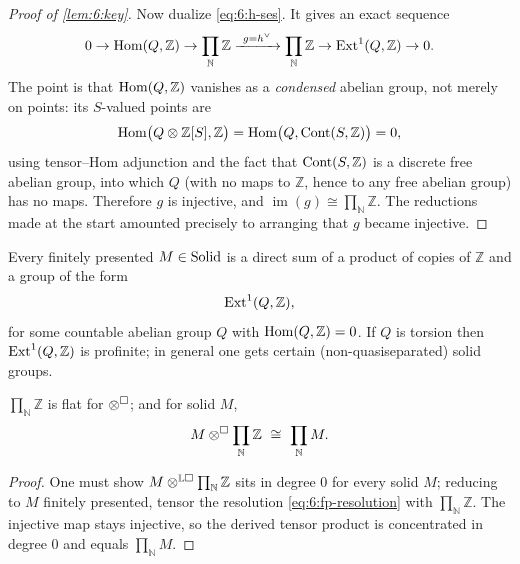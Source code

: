 \begin{proof}[Proof of \cref{lem:6:key}]
Now dualize \eqref{eq:6:h-ses}. It gives an exact sequence
\begin{equation*}
0\to\Homop(Q,\mathbb{Z})\to\prod_{\mathbb{N}}\mathbb{Z}\xrightarrow{\ g=h^{\vee}\ }
\prod_{\mathbb{N}}\mathbb{Z}\to\Ext^{1}(Q,\mathbb{Z})\to0 .
\end{equation*}
The point is that $\operatorname{Hom}(Q,\mathbb{Z})$ vanishes as a \emph{condensed} abelian
group, not merely on points: its $S$-valued points are
\begin{equation*}
\operatorname{Hom}\bigl(Q\otimes\mathbb{Z}[S],\mathbb{Z}\bigr)
=\operatorname{Hom}\bigl(Q,\operatorname{Cont}(S,\mathbb{Z})\bigr)=0,
\end{equation*}
using tensor--Hom adjunction and the fact that $\operatorname{Cont}(S,\mathbb{Z})$ is a discrete
free abelian group, into which $Q$ (with no maps to $\mathbb{Z}$, hence to any
free abelian group) has no maps. Therefore $g$ is injective, and
$\operatorname{im}(g)\cong\prod_{\mathbb{N}}\mathbb{Z}$. The reductions made at the
start amounted precisely to arranging that $g$ became injective.
\end{proof}

\begin{corollary}
\label{cor:6:fp-classification}
Every finitely presented $M\in\mathrm{Solid}$ is a direct sum of a product of copies of
$\mathbb{Z}$ and a group of the form
\begin{equation*}
\operatorname{Ext}^{1}(Q,\mathbb{Z}),
\end{equation*}
for some countable abelian group $Q$ with $\operatorname{Hom}(Q,\mathbb{Z})=0$. If $Q$ is
torsion then $\operatorname{Ext}^{1}(Q,\mathbb{Z})$ is profinite; in general one gets certain
(non-quasiseparated) solid groups.
\end{corollary}

\begin{corollary}
\label{cor:6:flat}
$\prod_{\mathbb{N}}\mathbb{Z}$ is flat for $\otimes^{\square}$; and for solid $M$,
\begin{equation*}
M\otimes^{\solid}\prod_{\mathbb{N}}\mathbb{Z}\ \cong\ \prod_{\mathbb{N}}M .
\end{equation*}
\end{corollary}

\begin{proof}
One must show $M\otimes^{\mathbb{L}\square}\prod_{\mathbb{N}}\mathbb{Z}$ sits in
degree $0$ for every solid $M$; reducing to $M$ finitely presented, tensor the
resolution \eqref{eq:6:fp-resolution} with $\prod_{\mathbb{N}}\mathbb{Z}$. The
injective map stays injective, so the derived tensor product is concentrated in
degree $0$ and equals $\prod_{\mathbb{N}}M$.
\end{proof}

